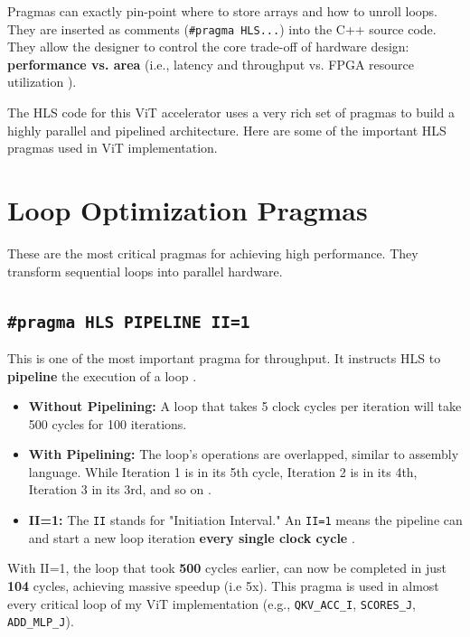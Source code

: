 Pragmas can exactly pin-point where to store arrays and how to unroll loops. They are inserted as comments (\texttt{\#pragma HLS...}) into the C++ source code. They allow the designer to control the core trade-off of hardware design: \textbf{performance vs. area} (i.e., latency and throughput vs. FPGA resource utilization \cite{ref3}).

The HLS code for this ViT accelerator uses a very rich set of pragmas to build a highly parallel and pipelined architecture. Here are some of the important HLS pragmas used in ViT implementation.

\section{Loop Optimization Pragmas}

These are the most critical pragmas for achieving high performance. They transform sequential loops into parallel hardware.

\subsection{\texttt{\#pragma HLS PIPELINE II=1}}
This is one of the most important pragma for throughput. It instructs HLS to \textbf{pipeline} the execution of a loop \cite{ref7}.
\begin{itemize}
    \item \textbf{Without Pipelining:} A loop that takes 5 clock cycles per iteration will take 500 cycles for 100 iterations.
    \item \textbf{With Pipelining:} The loop's operations are overlapped, similar to assembly language. While Iteration 1 is in its 5th cycle, Iteration 2 is in its 4th, Iteration 3 in its 3rd, and so on \cite{ref7}.
    \item \textbf{II=1:} The \texttt{II} stands for "Initiation Interval." An \texttt{II=1} means the pipeline can and start a new loop iteration \textbf{every single clock cycle} \cite{ref9, ref10}.
\end{itemize}
With II=1, the loop that took \textbf{500} cycles earlier, can now be completed in just \textbf{104} cycles, achieving massive speedup (i.e 5x). This pragma is used in almost every critical loop of my ViT implementation (e.g., \texttt{QKV\_ACC\_I}, \texttt{SCORES\_J}, \texttt{ADD\_MLP\_J}).



